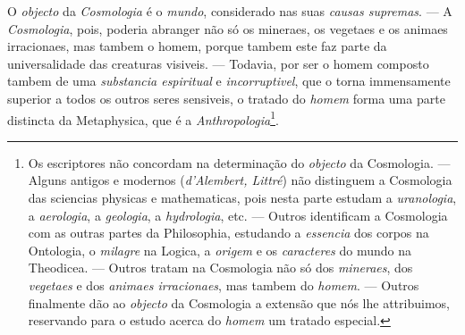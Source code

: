  O \emph{objecto} da \emph{Cosmologia} é o \emph{mundo},
considerado nas suas \emph{causas supremas}. --- A \emph{Cosmologia}, pois, poderia
abranger não só os mineraes, os vegetaes e os animaes irracionaes, mas tambem o homem,
porque tambem este faz parte da universalidade das creaturas visiveis. --- Todavia, por
ser o homem composto tambem de uma \emph{substancia espiritual} e \emph{incorruptivel},
que o torna immensamente superior a todos os outros seres sensiveis, o tratado do
\emph{homem} forma uma parte distincta da Metaphysica, que é a
\emph{Anthropologia}\footnote{Os escriptores não concordam na determinação do
\emph{objecto} da Cosmologia. --- Alguns antigos e modernos (\emph{d'Alembert, Littré})
não distinguem a Cosmologia das sciencias physicas e mathematicas, pois nesta parte
estudam a \emph{uranologia}, a \emph{aerologia}, a \emph{geologia}, a
\emph{hydrologia}, etc. --- Outros identificam a Cosmologia com as outras partes da
Philosophia, estudando a \emph{essencia} dos corpos na Ontologia, o \emph{milagre} na
Logica, a \emph{origem} e os \emph{caracteres} do mundo na Theodicea. --- Outros tratam
na Cosmologia não só dos \emph{mineraes}, dos \emph{vegetaes} e dos \emph{animaes
irracionaes}, mas tambem do \emph{homem}. --- Outros finalmente dão ao \emph{objecto} da
Cosmologia a extensão que nós lhe attribuimos, reservando para o estudo acerca do
\emph{homem} um tratado especial.}.

